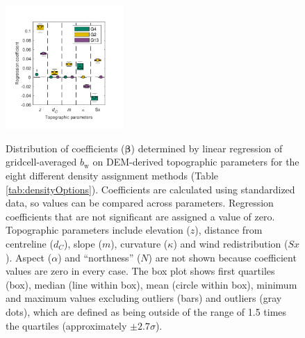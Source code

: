 \documentclass[review,oneside, letterpaper]{igs}
\renewcommand{\vector}[1]{\mathbf{#1}}
\begin{document}
\begin{figure}
	\centering
	\includegraphics[width =0.4\textwidth]{BetaCoeffs.pdf}\\
	\caption{Distribution of coefficients ($\vector{\beta}$) determined by linear regression of gridcell-averaged $b_\mathrm{w}$ on DEM-derived topographic parameters for the eight different density assignment methods (Table \ref{tab:densityOptions}). Coefficients are calculated using standardized data, so values can be compared across parameters. Regression coefficients that are not significant are assigned a value of zero. Topographic parameters include elevation ($z$), distance from centreline ($d_C$), slope ($m$), curvature ($\kappa$) and wind redistribution ($Sx$).  Aspect ($\alpha$) and ``northness'' ($N$) are not shown because coefficient values are zero in every case. The box plot shows first quartiles (box), median (line within box), mean (circle within box), minimum and maximum values excluding outliers (bars) and outliers (gray dots), which are defined as being outside of the range of 1.5 times the quartiles (approximately $\pm2.7\sigma$). }
	\label{fig:BetaCoeffs}
\end{figure}
\end{document}
